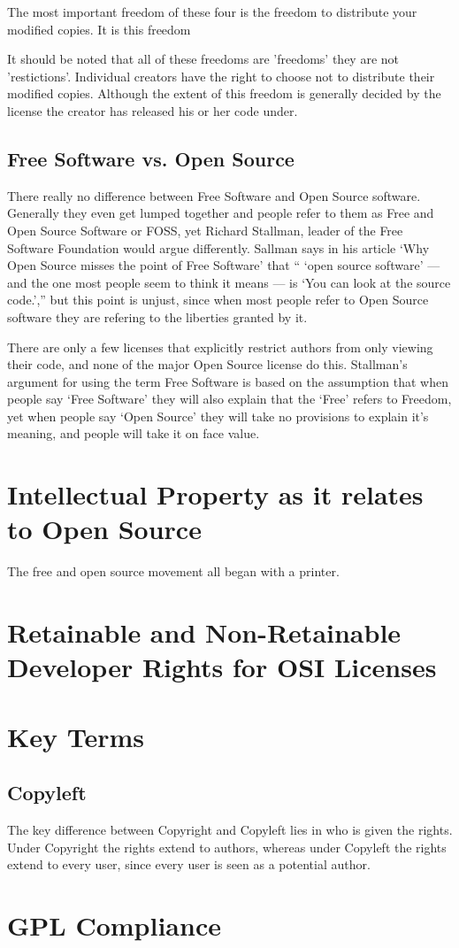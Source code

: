 \documentclass[12pt,letterpaper]{article}
\begin{document}
The most important freedom of these four is the freedom to distribute
your modified copies. It is this freedom

It should be noted that all of these freedoms are 'freedoms' they are
not 'restictions'. Individual creators have the right to choose not to
distribute their modified copies. Although the extent of this freedom is
generally decided by the license the creator has released his or her
code under.

\subsection*{Free Software vs. Open Source}
There really no difference between Free Software and Open Source software.
Generally they even get lumped together and people refer to them as Free and
Open Source Software or FOSS, yet Richard Stallman, leader of the Free Software
Foundation would argue differently. Sallman says in his article `Why Open
Source misses the point of Free Software' that `` `open source software' — and the
one most people seem to think it means — is `You can look at the source
code.','' but this point is unjust, since when most people refer to Open Source
software they are refering to the liberties granted by it. 

There are only a few licenses that explicitly restrict authors from only
viewing their code, and none of the major Open Source license do this.
Stallman's argument for using the term Free Software is based on the assumption
that when people say `Free Software' they will also explain that the `Free'
refers to Freedom, yet when people say `Open Source' they will take no
provisions to explain it's meaning, and people will take it on face value.  

\section*{Intellectual Property as it relates to Open Source}
The free and open source movement all began with a printer.


\section*{Retainable and Non-Retainable Developer Rights for OSI Licenses}


\section*{Key Terms}
\subsection*{Copyleft}
The key difference between Copyright and Copyleft lies in who is given
the rights. Under Copyright the rights extend to authors, whereas under
Copyleft the rights extend to every user, since every user is seen as a
potential author.


\section*{GPL Compliance}


\end{document}
